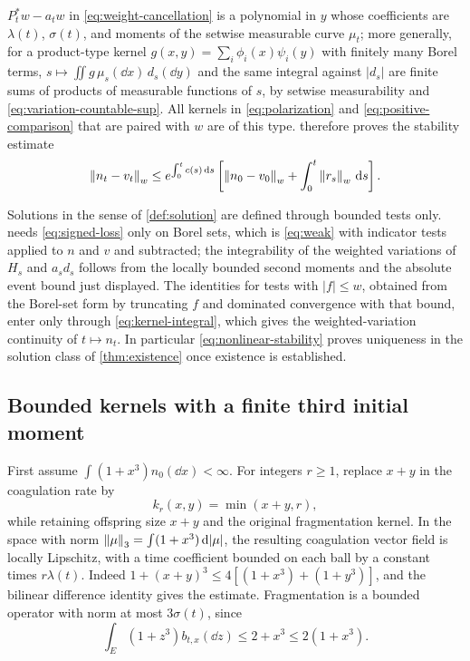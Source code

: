 $P_t^*w-a_tw$ in \eqref{eq:weight-cancellation} is a polynomial in $y$
whose coefficients are $\lambda(t)$, $\sigma(t)$, and moments of the
setwise measurable curve $\mu_t$; more generally, for a product-type
kernel $g(x,y)=\sum_i\phi_i(x)\psi_i(y)$ with finitely many Borel terms,
$s\mapsto\iint g\,\mu_s(\dd x)\,d_s(\dd y)$ and the same integral against
$|d_s|$ are finite sums of products of measurable functions of $s$, by
setwise measurability and \eqref{eq:variation-countable-sup}. All kernels
in \eqref{eq:polarization} and \eqref{eq:positive-comparison} that are
paired with $w$ are of this type.
 therefore proves the stability estimate
\begin{equation}
 \left\lVert n_t-v_t\right\rVert_w\leq
 e^{\int_0^t c(s)\,\mathrm d s}
 \left[\left\lVert n_0-v_0\right\rVert_w+\int_0^t\left\lVert r_s\right\rVert_w\,\mathrm d s\right].
 \label{eq:nonlinear-stability}
\end{equation}

Solutions in the sense of \cref{def:solution} are defined through
bounded tests only.  needs
\eqref{eq:signed-loss} only on Borel sets, which is \eqref{eq:weak} with
indicator tests applied to $n$ and $v$ and subtracted; the integrability
of the weighted variations of $H_s$ and $a_sd_s$ follows from the locally
bounded second moments and the absolute event bound just displayed. The
identities for tests with $|f|\leq w$, obtained from the Borel-set form by
truncating $f$ and dominated convergence with that bound, enter only
through \eqref{eq:kernel-integral}, which gives the weighted-variation
continuity of $t\mapsto n_t$. In particular
\eqref{eq:nonlinear-stability} proves uniqueness in the solution class of
\cref{thm:existence} once existence is established.

\subsection{Bounded kernels with a finite third initial moment}

First assume $\int(1+x^3)n_0(\dd x)<\infty$. For integers $r\geq1$, replace
$x+y$ in the coagulation rate by
\begin{equation}
 k_r(x,y)=\min(x+y,r),
 \label{eq:cutoff}
\end{equation}
while retaining offspring size $x+y$ and the original fragmentation
kernel. In the space with norm $\left\lVert \mu\right\rVert_3=\int(1+x^3)\,\mathrm d|\mu|$, the
resulting coagulation vector field is locally Lipschitz, with a time
coefficient bounded on each ball by a constant times $r\lambda(t)$.
Indeed $1+(x+y)^3\leq4[(1+x^3)+(1+y^3)]$, and the bilinear difference
identity gives the estimate. Fragmentation is a bounded operator with
norm at most $3\sigma(t)$, since
\begin{equation}
 \int_E(1+z^3)b_{t,x}(\dd z)\leq2+x^3\leq2(1+x^3).
 \label{eq:fragment-weight}
\end{equation}

